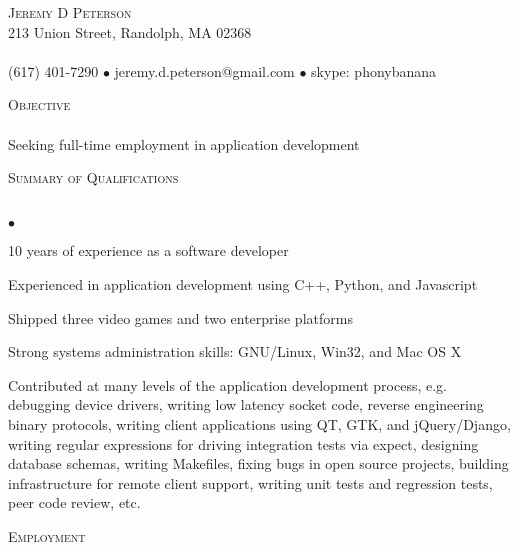 \documentclass{article}
\newcommand{\lineunder}{\vspace*{-8pt} \\ \hspace*{-18pt} \hrulefill \\}
\newcommand{\header}[1]{{\hspace*{-15pt}\vspace*{6pt} \textsc{#1}} \vspace*{-6pt} \lineunder}
\newcommand{\contact}[3]{
\vspace*{-8pt}
\begin{center}
{\LARGE \scshape {#1}}\\
#2 \lineunder 
#3
\end{center}
\vspace*{-8pt}
}
\newcommand{\objective}[1]{{ #1\vspace*{8pt} }}
\newenvironment{achievements}{\begin{list}{$\bullet$}{\topsep 0pt \itemsep -2pt}}{\vspace*{4pt}\end{list}}
\begin{document}
\small
\smallskip
\vspace*{-44pt}

\contact{Jeremy D Peterson}
{213 Union Street, Randolph, MA 02368}
{(617) 401-7290 $\bullet$ jeremy.d.peterson@gmail.com  $\bullet$ skype: phonybanana }

\header{Objective}
\objective {Seeking full-time employment in application development}

\header{Summary of Qualifications}
\begin{achievements}
\item 10 years of experience as a software developer
\item Experienced in application development using C++, Python, and Javascript
\item Shipped three video games and two enterprise platforms
\item Strong systems administration skills: GNU/Linux, Win32, and Mac OS X
\item Contributed at many levels of the application development process, e.g. debugging device drivers, writing low latency socket code, reverse engineering binary protocols, writing client applications using QT, GTK, and jQuery/Django, writing regular expressions for driving integration tests via expect, designing database schemas, writing Makefiles, fixing bugs in open source projects, building infrastructure for remote client support, writing unit tests and regression tests, peer code review, etc.
\end{achievements}

\header{Employment}
\end{document}
